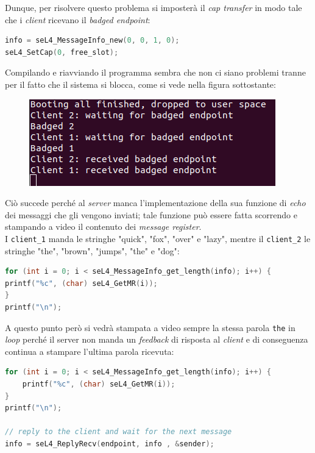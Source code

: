 Dunque, per risolvere questo problema si imposterà il \textit{cap transfer} in modo tale che i \textit{client} ricevano il \textit{badged endpoint}:
\begin{lstlisting}[language=C++]
info = seL4_MessageInfo_new(0, 0, 1, 0);
seL4_SetCap(0, free_slot);
\end{lstlisting}

Compilando e riavviando il programma sembra che non ci siano problemi tranne per il fatto che il sistema si blocca, come si vede nella figura sottostante:
\begin{figure}[H]
  \includegraphics[scale=0.7]{img/DopoBadgeIPC.png}%
  \centering
  \label{fig:AvvioDopoBadge}
\end{figure}

Ciò succede perché al \textit{server} manca l'implementazione della sua funzione di \textit{echo} dei messaggi che gli vengono inviati; tale funzione può essere fatta scorrendo e stampando a video il contenuto dei \textit{message register}.\\
I \texttt{client\_1} manda le stringhe {"quick", "fox", "over" e "lazy"}, mentre il \texttt{client\_2} le stringhe {"the", "brown", "jumps", "the" e "dog"}:
\begin{lstlisting}[language=C++]
for (int i = 0; i < seL4_MessageInfo_get_length(info); i++) {
printf("%c", (char) seL4_GetMR(i));
}
printf("\n");
\end{lstlisting}

A questo punto però si vedrà stampata a video sempre la stessa parola \texttt{the} in \textit{loop} perché il server non manda un \textit{feedback} di risposta al \textit{client} e di conseguenza continua a stampare l'ultima parola ricevuta:
\begin{lstlisting}[language=C++]
for (int i = 0; i < seL4_MessageInfo_get_length(info); i++) {
	printf("%c", (char) seL4_GetMR(i));
}
printf("\n");

// reply to the client and wait for the next message
info = seL4_ReplyRecv(endpoint, info , &sender);
\end{lstlisting}

